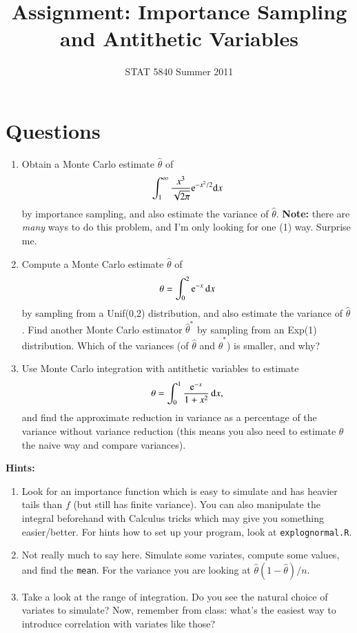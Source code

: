 \documentclass[11pt,english]{article}
\title{Assignment: Importance Sampling and Antithetic Variables}
\author{STAT 5840 Summer 2011}
\date{}
\begin{document}
\maketitle


\section*{Questions}
\label{sec-1}



\begin{enumerate}
\item Obtain a Monte Carlo estimate $\hat{\theta}$ of 
   \[
   \int_{1}^{\infty} \frac{x^{3}}{\sqrt{2\pi}}\mathrm{e}^{-x^2/2} \mathrm{d} x
   \]
   by importance sampling,  and also estimate the variance of $\hat{\theta}$.  \textbf{Note:} there are \emph{many} ways to do this problem, and I'm only looking for one (1) way.  Surprise me.
\item Compute a Monte Carlo estimate $\hat{\theta}$ of 
   \[
   \theta = \int_{0}^{2} \mathrm{e} ^{-x}\,\mathrm{d} x
   \]
   by sampling from a Unif(0,2) distribution, and also estimate the variance of $\hat{\theta}$. Find another Monte Carlo estimator $\hat{\theta}^{\ast}$ by sampling from an Exp(1) distribution.  Which of the variances (of $\hat{\theta}$ and $\hat{\theta}^{\ast}$) is smaller, and why?
\item Use Monte Carlo integration with antithetic variables to estimate
   \[
   \theta = \int_{0}^{1} \frac{\mathrm{e} ^{-x}}{1 + x^{2}}\,\mathrm{d} x,
   \]
   and find the approximate reduction in variance as a percentage of the variance without variance reduction (this means you also need to estimate $\theta$ the naive way and compare variances).
\end{enumerate}

\textbf{Hints:}


\begin{enumerate}
\item Look for an importance function which is easy to simulate and has heavier tails than $f$ (but still has finite variance).  You can also manipulate the integral beforehand with Calculus tricks which may give you something easier/better.  For hints how to set up your program, look at \texttt{explognormal.R}.
\item Not really much to say here.  Simulate some variates, compute some values, and find the \texttt{mean}.  For the variance you are looking at $\hat{\theta}(1 - \hat{\theta})/n$.
\item Take a look at the range of integration.  Do you see the natural choice of variates to simulate?  Now, remember from class: what's the easiest way to introduce correlation with variates like those?
\end{enumerate}
\end{document}
